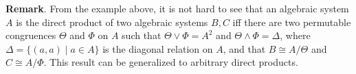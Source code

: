 \documentclass[12pt]{article}
\begin{document}
\textbf{Remark}.  From the example above, it is not hard to see that an algebraic system $A$ is the direct product of two algebraic systems $B,C$ iff there are two permutable congruences $\Theta$ and $\Phi$ on $A$ such that $\Theta \vee \Phi = A^2$ and $\Theta\wedge \Phi=\Delta$, where $\Delta=\lbrace (a,a)\mid a\in A\rbrace$ is the diagonal relation on $A$, and that $B\cong A/\Theta$ and $C\cong A/\Phi$.  This result can be generalized to arbitrary direct products.
\end{document}
